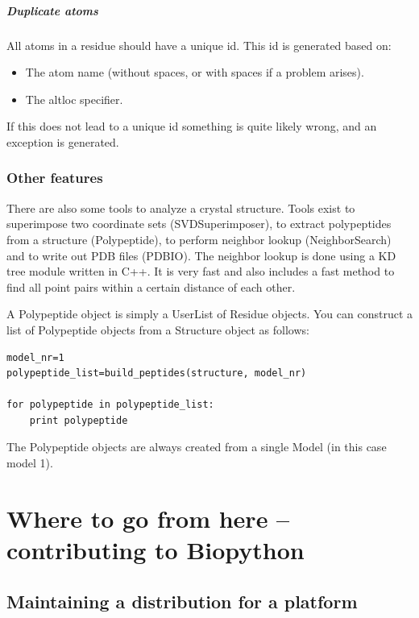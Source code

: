 \documentclass{report}
\begin{document}
\paragraph{Duplicate atoms}

All atoms in a residue should have a unique id. This id is generated based on:

\begin{itemize}
\item The atom name (without spaces, or with spaces if a problem arises).
\item The altloc specifier.
\end{itemize}
If this does not lead to a unique id something is quite likely wrong, and an
exception is generated.

\subsection{Other features}

There are also some tools to analyze a crystal structure. Tools
exist to superimpose two coordinate sets (SVDSuperimposer), to extract 
polypeptides from a structure (Polypeptide), to perform neighbor lookup
(NeighborSearch) and to write out PDB files (PDBIO). The neighbor lookup
is done using a KD tree module written in C++. It is very fast and also
includes a fast method to find all point pairs within a certain distance 
of each other.

A Polypeptide object is simply a UserList of Residue objects. You can 
construct a list of Polypeptide objects from a Structure object as follows:

\begin{verbatim}
model_nr=1
polypeptide_list=build_peptides(structure, model_nr)

for polypeptide in polypeptide_list:
    print polypeptide
\end{verbatim}

The Polypeptide objects are always created from a single 
Model (in this case model 1).





\chapter{Where to go from here -- contributing to Biopython}

\section{Maintaining a distribution for a platform}
\label{sec:maintain_dist}
\end{document}
